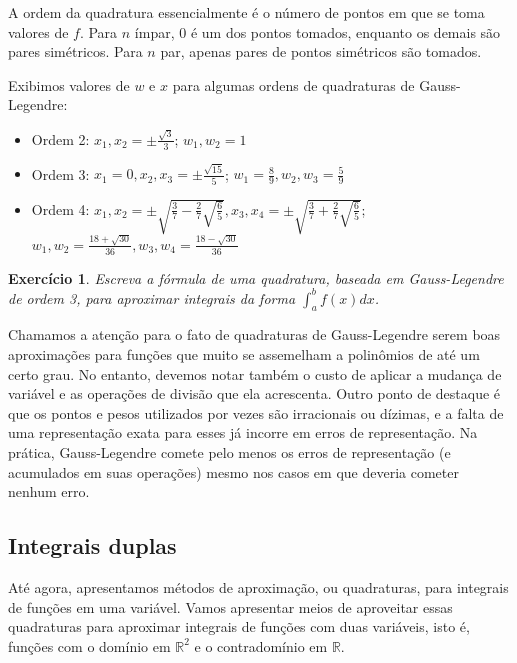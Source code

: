 \documentclass[]{article}
\newtheorem{exercicio}{Exercício}
\numberwithin{equation}{section}
\begin{document}
A ordem da quadratura essencialmente é o número de pontos em que se
toma valores de $f$. Para $n$ ímpar, 0 é um dos pontos tomados,
enquanto os demais são pares simétricos. Para $n$ par, apenas pares de
pontos simétricos são tomados.

Exibimos valores de $w$ e $x$ para algumas ordens de quadraturas de
Gauss-Legendre:

\begin{itemize}
	\item
		Ordem 2: $x_1, x_2 = \pm \frac{\sqrt{3}}{3}$; $w_1, w_2 = 1$
	\item
		Ordem 3: $x_1 = 0, x_2, x_3 = \pm \frac{\sqrt{15}}{5}$; $w_1 = \frac{8}{9}, w_2, w_3 = \frac{5}{9}$
	\item
		Ordem 4: $x_1, x_2 = \pm \sqrt{\frac{3}{7} - \frac{2}{7} \sqrt{\frac{6}{5}}}, x_3, x_4 = \pm \sqrt{\frac{3}{7} + \frac{2}{7} \sqrt{\frac{6}{5}}}$; $w_1, w_2 = \frac{18 + \sqrt{30}}{36}, w_3, w_4 = \frac{18 - \sqrt{30}}{36}$
\end{itemize}

\begin{exercicio}
  Escreva a fórmula de uma quadratura, baseada em Gauss-Legendre de
  ordem 3, para aproximar integrais da forma $\int_{a}^{b} f(x) dx$.
\end{exercicio}

Chamamos a atenção para o fato de quadraturas de Gauss-Legendre serem
boas aproximações para funções que muito se assemelham a polinômios de
até um certo grau. No entanto, devemos notar também o custo de aplicar
a mudança de variável e as operações de divisão que ela
acrescenta. Outro ponto de destaque é que os pontos e pesos utilizados
por vezes são irracionais ou dízimas, e a falta de uma representação
exata para esses já incorre em erros de representação. Na prática,
Gauss-Legendre comete pelo menos os erros de representação (e
acumulados em suas operações) mesmo nos casos em que deveria cometer
nenhum erro.

\subsection{Integrais duplas}

Até agora, apresentamos métodos de aproximação, ou quadraturas, para integrais de funções em uma variável. Vamos apresentar meios de aproveitar essas quadraturas para aproximar integrais de funções com duas variáveis, isto é, funções com o domínio em $\mathbb{R}^2$ e o contradomínio em $\mathbb{R}$.
\end{document}
